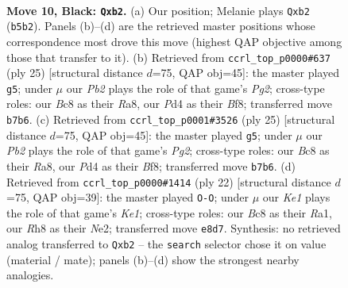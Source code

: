 \documentclass[11pt]{article}
\begin{document}
\begin{figure}[p]\centering
\begin{subfigure}{0.46\textwidth}\centering
\resizebox{\linewidth}{!}{%
\newchessgame
\chessboard[
  setfen={r1b1kb1r/pp3ppp/2n2B2/1q2p3/3pN3/3P4/PPPQ1PPP/R3K1NR b KQkq - 0 10},
  showmover=false,
  pgfstyle=straightmove, color=movearrow, markmove={b5-b2}
]}
\caption{}
\end{subfigure}\hfill
\begin{subfigure}{0.46\textwidth}\centering
\resizebox{\linewidth}{!}{%
\newchessgame
\chessboard[
  setfen={r1b1kb1r/pp3pp1/4pn1p/3q4/3P4/3Q1N1N/PPP2PPP/R1B1K2R b KQkq - 3 13},
  showmover=false,
  pgfstyle=straightmove, color=movearrow, markmove={g7-g5}
]}
\caption{}
\end{subfigure}
\\[4pt]
\begin{subfigure}{0.46\textwidth}\centering
\resizebox{\linewidth}{!}{%
\newchessgame
\chessboard[
  setfen={r1b1kb1r/pp3pp1/4pn1p/3q4/3P4/3Q1N1N/PPP2PPP/R1B1K2R b KQkq - 3 13},
  showmover=false,
  pgfstyle=straightmove, color=movearrow, markmove={g7-g5}
]}
\caption{}
\end{subfigure}\hfill
\begin{subfigure}{0.46\textwidth}\centering
\resizebox{\linewidth}{!}{%
\newchessgame
\chessboard[
  setfen={r2qk2r/p2p1ppp/bpn1p3/b7/Q1PP4/P1P3P1/4NPBP/R1B1K2R w KQkq - 1 12},
  showmover=false,
  pgfstyle=straightmove, color=movearrow, markmove={e1-g1}
]}
\caption{}
\end{subfigure}
\caption{\textbf{Move 10, Black: \texttt{Qxb2}.} (a) Our position; Melanie plays \texttt{Qxb2} (\texttt{b5b2}). Panels (b)--(d) are the retrieved master positions whose correspondence most drove this move (highest QAP objective among those that transfer to it). (b) Retrieved from \texttt{ccrl\_top\_p0000\#637} (ply 25) [structural distance $d$=75, QAP obj=45]: the master played \texttt{g5}; under $\mu$ our \emph{Pb2} plays the role of that game's \emph{Pg2}; cross-type roles: our \emph{B}c8 as their \emph{R}a8, our \emph{P}d4 as their \emph{B}f8; transferred move \texttt{b7b6}. (c) Retrieved from \texttt{ccrl\_top\_p0001\#3526} (ply 25) [structural distance $d$=75, QAP obj=45]: the master played \texttt{g5}; under $\mu$ our \emph{Pb2} plays the role of that game's \emph{Pg2}; cross-type roles: our \emph{B}c8 as their \emph{R}a8, our \emph{P}d4 as their \emph{B}f8; transferred move \texttt{b7b6}. (d) Retrieved from \texttt{ccrl\_top\_p0000\#1414} (ply 22) [structural distance $d$=75, QAP obj=39]: the master played \texttt{O-O}; under $\mu$ our \emph{Ke1} plays the role of that game's \emph{Ke1}; cross-type roles: our \emph{B}c8 as their \emph{R}a1, our \emph{R}h8 as their \emph{N}e2; transferred move \texttt{e8d7}. Synthesis: no retrieved analog transferred to \texttt{Qxb2} -- the \texttt{search} selector chose it on value (material / mate); panels (b)--(d) show the strongest nearby analogies.}
\label{fig:thought-m19}
\end{figure}
\end{document}
